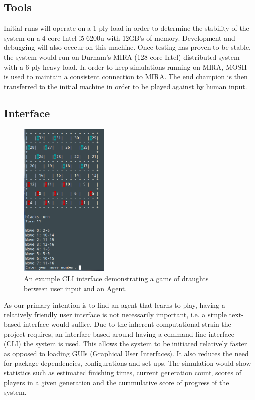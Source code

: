 \documentclass[12pt,a4paper]{article}
\begin{document}
\subsection*{Tools}

    Initial runs will operate on a 1-ply load in order to determine the stability of the system on a 4-core Intel i5 6200u with 12GB's of memory. Development and debugging will also occcur on this machine. Once testing has proven to be stable, the system would run on Durham's MIRA (128-core Intel) distributed system with a 6-ply heavy load. In order to keep simulations running on MIRA, MOSH is used to maintain a consistent connection to MIRA. The end champion is then transferred to the initial machine in order to be played against by human input.

\subsection*{Interface}

    \begin{figure}
        \vspace{-30pt}
        \centering
        \caption{An example CLI interface demonstrating a game of draughts between user input and an Agent. \label{cli_humaninput}}
        \includegraphics[width=43mm]{cli_humanvsagent.png}
        \vspace{-20pt}
    \end{figure}

    As our primary intention is to find an agent that learns to play, having a relatively friendly user interface is not necessarily important, i.e. a simple text-based interface would suffice. Due to the inherent computational strain the project requires, an interface based around having a command-line interface (CLI) the system is used. This allows the system to be initiated relatively faster as opposed to loading GUIs (Graphical User Interfaces). It also reduces the need for package dependencies, configurations and set-ups.  The simulation would show statistics such as estimated finishing times, current generation count, scores of players in a given generation and the cummulative score of progress of the system.
\end{document}
